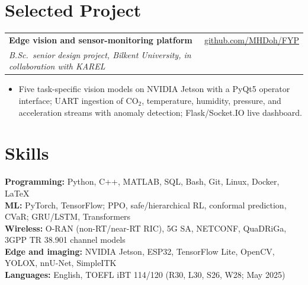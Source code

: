 \documentclass[10pt,a4paper]{article}
\makeatletter
\newcommand{\entry}[4]{%
  \noindent\begin{tabular*}{\linewidth}{@{}l@{\extracolsep{\fill}}r@{}}
    \textbf{#1} & #2 \\
    \textit{#3} & \textit{#4}
  \end{tabular*}\par}
\makeatother
\begin{document}
\section{Selected Project}
\entry{Edge vision and sensor-monitoring platform}{\href{https://github.com/MHDoh/FYP}{github.com/MHDoh/FYP}}
      {B.Sc.\ senior design project, Bilkent University, in collaboration with KAREL}{}
\begin{itemize}
  \item Five task-specific vision models on NVIDIA Jetson with a PyQt5 operator interface; UART ingestion of CO$_2$,
        temperature, humidity, pressure, and acceleration streams with anomaly detection; Flask/Socket.IO live dashboard.
\end{itemize}

\section{Skills}
\textbf{Programming:} Python, C++, MATLAB, SQL, Bash, Git, Linux, Docker, LaTeX\\
\textbf{ML:} PyTorch, TensorFlow; PPO, safe/hierarchical RL, conformal prediction, CVaR; GRU/LSTM, Transformers\\
\textbf{Wireless:} O-RAN (non-RT/near-RT RIC), 5G SA, NETCONF, QuaDRiGa, 3GPP TR 38.901 channel models\\
\textbf{Edge and imaging:} NVIDIA Jetson, ESP32, TensorFlow Lite, OpenCV, YOLOX, nnU-Net, SimpleITK\\
\textbf{Languages:} English, TOEFL iBT 114/120 (R30, L30, S26, W28; May 2025)
\end{document}
